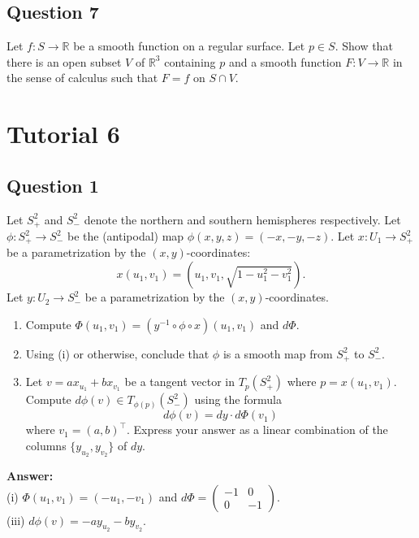 \documentclass[12pt, a4paper]{article}
\newcommand{\R}{\mathbb{R}}
\begin{document}
\subsection*{Question 7}
Let $f:S\rightarrow\R$ be a smooth function on a regular surface. Let $p\in S$. Show that there is an open subset $V$ of $\R^{3}$ containing $p$ and a smooth function $F:V\rightarrow\R$ in the sense of calculus such that $F=f$ on $S\cap V$.
\newpage

\section*{Tutorial 6}

\subsection*{Question 1}
Let $S_{+}^{2}$ and $S_{-}^{2}$ denote the northern and southern hemispheres respectively. Let $\phi: S_{+}^{2}\rightarrow S_{-}^{2}$ be the (antipodal) map $\phi(x,y,z)=(-x,-y,-z)$.
Let $x:U_{1}\rightarrow S_{+}^{2}$ be a parametrization by the $(x,y)$-coordinates:
\[ x(u_{1},v_{1})=(u_{1},v_{1},\sqrt{1-u_{1}^{2}-v_{1}^{2}}). \]
Let $y:U_{2}\rightarrow S_{-}^{2}$ be a parametrization by the $(x,y)$-coordinates.
\begin{enumerate}[label=(\roman*)]
    \item Compute $\Phi(u_{1},v_{1})=(y^{-1}\circ\phi\circ x)(u_{1},v_{1})$ and $d\Phi$.
    \item Using (i) or otherwise, conclude that $\phi$ is a smooth map from $S_{+}^{2}$ to $S_{-}^{2}$.
    \item Let $v=ax_{u_{1}}+bx_{v_{1}}$ be a tangent vector in $T_{p}(S_{+}^{2})$ where $p=x(u_{1},v_{1})$. Compute $d\phi(v)\in T_{\phi(p)}(S_{-}^{2})$ using the formula
    \[ d\phi(v)=dy\cdot d\Phi(v_{1}) \]
    where $v_{1}=(a,b)^{\top}$. Express your answer as a linear combination of the columns $\{y_{u_{2}},y_{v_{2}}\}$ of $dy$.
\end{enumerate}

\vspace{1em}
\noindent\textbf{Answer:}\\
(i) $\Phi(u_{1},v_{1})=(-u_{1},-v_{1})$ and $d\Phi=\begin{pmatrix}-1&0\\ 0&-1\end{pmatrix}$.\\
(iii) $d\phi(v)=-ay_{u_{2}}-by_{v_{2}}.$
\newpage
\end{document}
